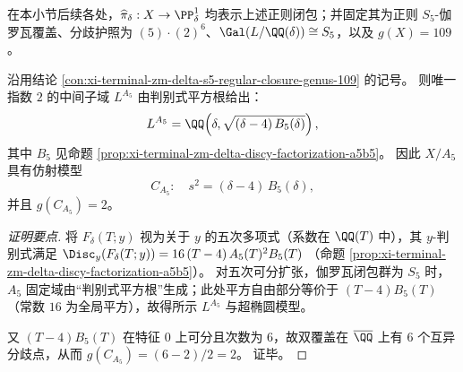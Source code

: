 在本小节后续各处，\(\widehat\pi_\delta:X\to\PP^1_\delta\) 均表示上述正则闭包；并固定其为正则 \(S_5\)-伽罗瓦覆盖、分歧护照为 \((5)\cdot(2)^6\)、\(\Gal(L/\QQ(\delta))\cong S_5\)，以及 \(g(X)=109\)。

\begin{conclusion}\label{con:xi-terminal-zm-delta-a5-fixedfield-hyperelliptic-genus2}
沿用结论 \ref{con:xi-terminal-zm-delta-s5-regular-closure-genus-109} 的记号。
则唯一指数 \(2\) 的中间子域 \(L^{A_5}\) 由判别式平方根给出：
\[
L^{A_5}=\QQ\!\left(\delta,\sqrt{(\delta-4)\,B_5(\delta)}\right),
\]
其中 \(B_5\) 见命题 \ref{prop:xi-terminal-zm-delta-discy-factorization-a5b5}。
因此 \(X/A_5\) 具有仿射模型
\[
C_{A_5}:\quad s^2=(\delta-4)\,B_5(\delta),
\]
并且 \(g(C_{A_5})=2\)。
\end{conclusion}
\begin{proof}[证明要点]
将 \(F_\delta(T;y)\) 视为关于 \(y\) 的五次多项式（系数在 \(\QQ(T)\) 中），其 \(y\)-判别式满足
\(
\Disc_{y}(F_\delta(T;y))=16\,(T-4)\,A_5(T)^2B_5(T)
\)
（命题 \ref{prop:xi-terminal-zm-delta-discy-factorization-a5b5}）。
对五次可分扩张，伽罗瓦闭包群为 \(S_5\) 时，\(A_5\) 固定域由“判别式平方根”生成；此处平方自由部分等价于 \((T-4)B_5(T)\)（常数 \(16\) 为全局平方），故得所示 \(L^{A_5}\) 与超椭圆模型。
\par
又 \((T-4)B_5(T)\) 在特征 \(0\) 上可分且次数为 \(6\)，故双覆盖在 \(\overline{\QQ}\) 上有 \(6\) 个互异分歧点，从而
\(
g(C_{A_5})=(6-2)/2=2
\)。
证毕。
\end{proof}



